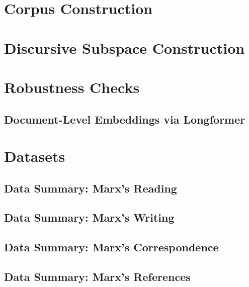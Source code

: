\singlespacing

\section{Corpus Construction\label{app:corpus}}



\section{Discursive Subspace Construction\label{app:subspace}}



\section{Robustness Checks\label{app:robustness}}

\subsection{Document-Level Embeddings via Longformer\label{app:longformer}}



\section{Datasets\label{app:datasets}}

\subsection{Data Summary: Marx's Reading\label{app:marxreading}}



\subsection{Data Summary: Marx's Writing\label{app:marxwriting}}



\subsection{Data Summary: Marx's Correspondence\label{app:marxletters}}



\subsection{Data Summary: Marx's References\label{app:marxrefs}}

